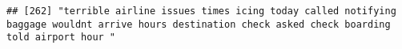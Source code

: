 \documentclass[
]{article}
\begin{document}
\begin{verbatim}
## [262] "terrible airline issues times icing today called notifying baggage wouldnt arrive hours destination check asked check boarding told airport hour "                                                                                                                                                                                                                                                                                                                                                                                                                                                                                                                                                                                                                                                                                                                                                                                                                                                                                                                                                                                                                                                                                                                                                                                                                                                                                                                                                                                                                                                                                                                                                                                                                                             

\end{verbatim}
\end{document}
